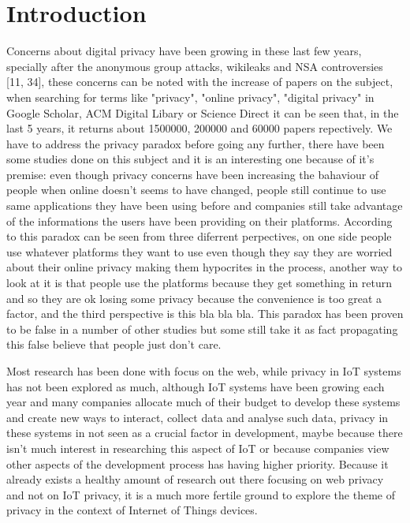 \documentclass[conference]{IEEEtran}
\begin{document}
\section{Introduction}
Concerns about digital privacy have been growing in these last few
years, specially after the anonymous group attacks, wikileaks and NSA controversies [11, 34],
these concerns can be noted with the increase of papers on the subject,
when searching for terms like "privacy", "online privacy",
"digital privacy" in Google Scholar, ACM Digital Libary or Science Direct it
can be seen that, in the last 5 years, it returns about 1500000, 200000 and 60000
papers repectively.
We have to address the privacy paradox before going any further, there have been some studies
done on this subject and it is an interesting one because of it's premise:
even though privacy concerns have been increasing the bahaviour of people
when online doesn't seems to have changed, people still continue to use same
applications they have been using before and companies still take
advantage of the informations the users have been providing on their
platforms. According to \cite{} this paradox can be seen from three diferrent
perpectives, on one side people use whatever platforms they want to use
even though they say they are worried about their online privacy making them
hypocrites in the process, another way to look at it is that people use
the platforms because they get something in return and so they
are ok losing some privacy because the convenience is too great a factor, and 
the third perspective is this bla bla bla. This paradox has been proven
to be false in a number of other studies but some still take it as fact 
propagating this false believe that people just don't care.

Most research has been done with focus on the web, while privacy in IoT
systems has not been explored as much, although IoT systems have been
growing each year and many companies allocate much of their budget to
develop these systems and create new ways to interact, collect data and
analyse such data, privacy in these systems in not seen as a crucial
factor in development, maybe because there isn't much
interest in researching this aspect of IoT or because companies view other
aspects of the development process has having higher priority.
Because it already exists a healthy amount of research out there
focusing on web privacy and not on IoT privacy, it is a much more
fertile ground to explore the theme of privacy in the context of
Internet of Things devices.
\end{document}

